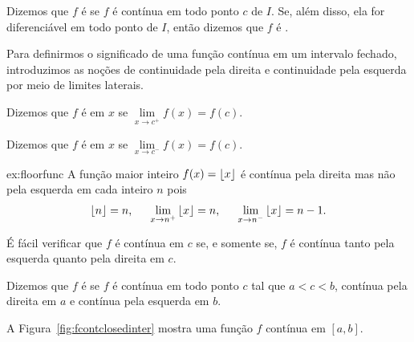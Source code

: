 \begin{definition*}
  Dizemos que $f$ é 
 se $f$ é contínua em todo ponto $c$ de $I$. Se, além disso, ela
for diferenciável em todo ponto de $I$, então dizemos que $f$ é
.
\end{definition*}

Para definirmos o significado de uma função contínua em um intervalo fechado,
introduzimos as noções de continuidade pela direita e continuidade pela
esquerda por meio de limites laterais.

\begin{definition*}
  Dizemos que $f$ é 
 em $x$ se
$\lim\limits_{x \to c^+} f(x) = f(c)$.

  Dizemos que $f$ é 
 em $x$ se
$\lim\limits_{x \to c^-} f(x) = f(c)$.
\end{definition*}

\begin{examplecont}{ex:floorfunc}
  A função maior inteiro $f(x) = \left\lfloor x\right\rfloor$ é contínua pela direita mas não
  pela esquerda em cada inteiro $n$ pois
  $$
    \left\lfloor n\right\rfloor = n, \hspace{1.5em} \lim_{x \to n^+} \left\lfloor x\right\rfloor = n,
    \hspace{1.5em} \lim_{x \to n^-} \left\lfloor x\right\rfloor = n - 1.
  $$
\end{examplecont}

É fácil verificar que $f$ é contínua em $c$ se, e somente se, $f$ é contínua
tanto pela esquerda quanto pela direita em $c$.

\begin{definition*}
  Dizemos que $f$ é 
 se $f$ é contínua em todo ponto $c$ tal que $a < c < b$,
contínua pela direita em $a$ e contínua pela esquerda em $b$.
\end{definition*}

A Figura~\ref{fig:fcontclosedinter} mostra uma função $f$ contínua em
$[a, b]$.



